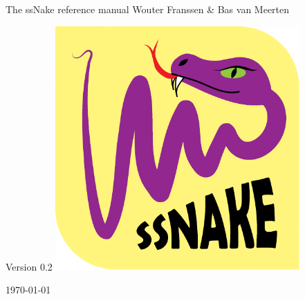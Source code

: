 \begin{titlepage}
\begin{center}




{\Huge The ssNake reference manual}
\vfill
\large Wouter Franssen \& Bas van Meerten

\vspace{1cm}
\large Version 0.2
\vfill
\includegraphics[width=0.7\textwidth]{Images/logo.pdf}\

\vfill
\vfill
{\large \today}

\end{center}

\end{titlepage}